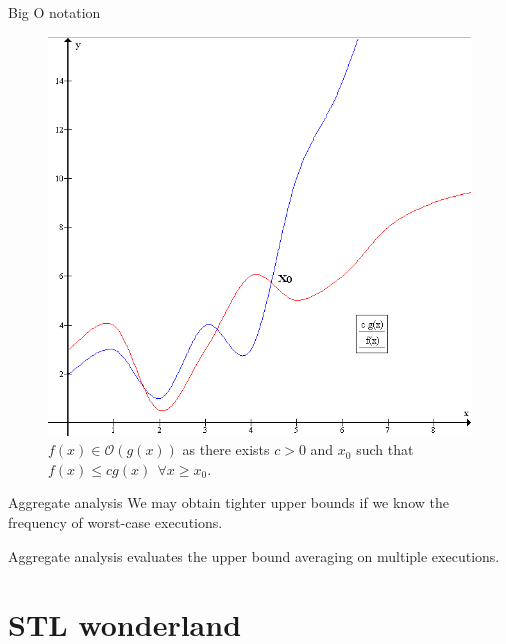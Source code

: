 \documentclass[compress]{beamer}
\begin{document}
\begin{frame}{Big O notation}
\begin{figure}
\includegraphics[height=0.8\textheight]{Big-O-notation}
\caption{ $f(x) \in \mathcal{O}(g(x))$ as there exists $c > 0$ and $x_0$ such that $f(x) \leq cg(x) ~~ \forall x \geq x_0$.}
\end{figure}
\end{frame}


\begin{frame}{Aggregate analysis}
    We may obtain tighter upper bounds if we know the frequency of worst-case executions.
    
    Aggregate analysis evaluates the upper bound averaging on multiple executions.

\end{frame}

\section{STL wonderland}
\end{document}
